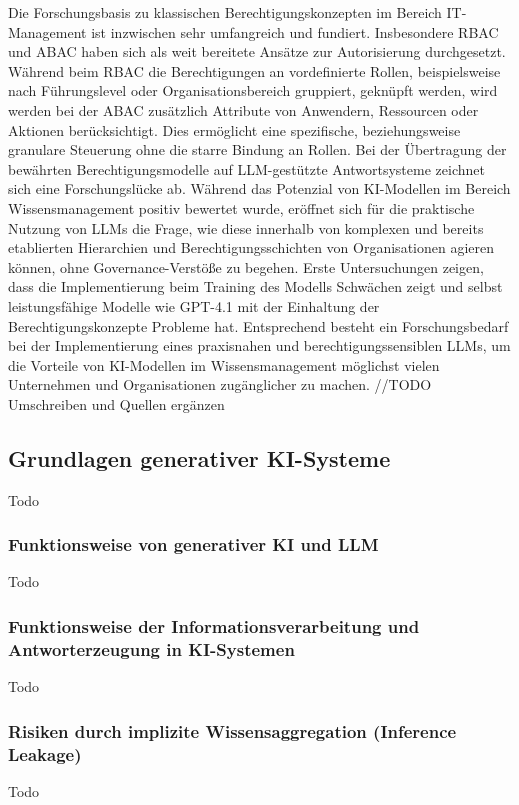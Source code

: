 Die Forschungsbasis zu klassischen Berechtigungskonzepten im Bereich IT-Management ist inzwischen sehr umfangreich und fundiert. Insbesondere RBAC und ABAC haben sich als weit bereitete Ansätze zur Autorisierung durchgesetzt.  Während beim RBAC die Berechtigungen an vordefinierte Rollen, beispielsweise nach Führungslevel oder Organisationsbereich gruppiert, geknüpft werden, wird werden bei der ABAC zusätzlich Attribute von Anwendern, Ressourcen oder Aktionen berücksichtigt. Dies ermöglicht eine spezifische, beziehungsweise granulare Steuerung ohne die starre Bindung an Rollen. Bei der Übertragung der bewährten Berechtigungsmodelle auf LLM-gestützte Antwortsysteme zeichnet sich eine Forschungslücke ab. Während das Potenzial von KI-Modellen im Bereich Wissensmanagement positiv bewertet wurde, eröffnet sich für die praktische Nutzung von LLMs die Frage, wie diese innerhalb von komplexen und bereits etablierten Hierarchien und Berechtigungsschichten von Organisationen agieren können, ohne Governance-Verstöße zu begehen.
Erste Untersuchungen zeigen, dass die Implementierung beim Training des Modells Schwächen zeigt und selbst leistungsfähige Modelle wie GPT-4.1 mit der Einhaltung der Berechtigungskonzepte Probleme hat.  Entsprechend besteht ein Forschungsbedarf bei der Implementierung eines praxisnahen und berechtigungssensiblen LLMs, um die Vorteile von KI-Modellen im Wissensmanagement möglichst vielen Unternehmen und Organisationen zugänglicher zu machen.
//TODO Umschreiben und Quellen ergänzen

\subsection{Grundlagen generativer KI-Systeme}
Todo

\subsubsection{Funktionsweise von generativer KI und LLM}
Todo

\subsubsection{Funktionsweise der Informationsverarbeitung und Antworterzeugung in KI-Systemen}
Todo

\subsubsection{Risiken durch implizite Wissensaggregation (Inference Leakage)}
Todo

